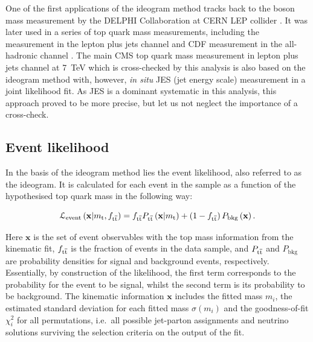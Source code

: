 One of the first applications of the ideogram method tracks back to the \W boson mass measurement by the \textsc{DELPHI}
Collaboration at CERN LEP collider \autocite{DELPHI_1998, DELPHI_2008}. It was later used in a series of top quark mass
measurements, including the \Dzero measurement in the lepton plus jets channel \autocite{D0_top_mass_ljets_ideogram} and
CDF measurement in the all-hadronic channel \autocite{CDF_ideogram}. The main CMS top quark mass measurement in lepton
plus jets channel at \SI{7}{\TeV} \autocite{top_mass_ljets_CMS} which is cross-checked by this analysis is also based on
the ideogram method with, however, \textit{in situ} JES (jet energy scale) measurement in a joint likelihood fit. As JES
is a dominant systematic in this analysis, this approach proved to be more precise, but let us not neglect the
importance of a cross-check.

\subsection{Event likelihood}
\label{ss_top_mass:event_likelihood}

In the basis of the ideogram method lies the event likelihood, also referred to as the ideogram. It is calculated for
each event in the sample as a function of the hypothesised top quark mass \mtop in the following way:

\begin{equation}
\mathcal{L}_\textrm{event} \left(\mathbf{x}|m_\mathrm{t}, f_{\mathrm{t}\overline{\mathrm{t}}} \right) = f_{\mathrm{t}\overline{\mathrm{t}}} P_{\mathrm{t}\overline{\mathrm{t}}}
\left(\mathbf{x}|m_\mathrm{t}\right) + \left(1 - f_{\mathrm{t}\overline{\mathrm{t}}} \right)P_\textrm{bkg}\left(\mathbf{x}\right).
\label{eq:event_likelihood}
\end{equation}

Here $\mathbf{x}$ is the set of event observables with the top mass information from the kinematic fit, $f_{\mathrm{t}\overline{\mathrm{t}}}$ is
the fraction of \ttbar events in the data sample, and $P_{\mathrm{t}\overline{\mathrm{t}}}$ and $P_\textrm{bkg}$ are probability densities for
signal and background events, respectively. Essentially, by construction of the likelihood, the first term corresponds
to the probability for the event to be signal, whilst the second term is its probability to be background. The kinematic
information $\mathbf{x}$ includes the fitted mass $m_{i}$, the estimated standard deviation for each fitted mass
$\sigma(m_{i})$ and the goodness-of-fit $\chi^{2}_{i}$ for all permutations, i.e.\ all possible jet-parton assignments
and neutrino solutions surviving the selection criteria on the output of the fit.

